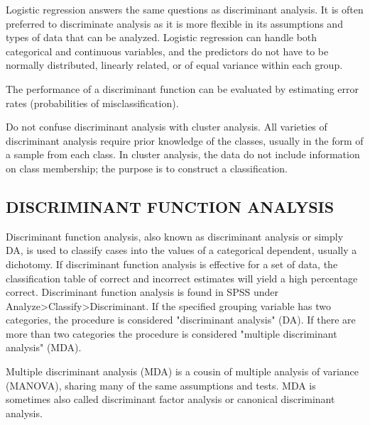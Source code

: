 
%
%
%

Logistic regression answers the same questions as discriminant analysis. It is
often preferred to discriminate analysis as it is more flexible in its assumptions
and types of data that can be analyzed. Logistic regression can handle both
categorical and continuous variables, and the predictors do not have to be
normally distributed, linearly related, or of equal variance within each group.

The performance of a discriminant function can be evaluated by estimating error rates
(probabilities of misclassification).

Do not confuse discriminant analysis with cluster analysis. All varieties of discriminant
analysis require prior knowledge of the classes, usually in the form of a sample
from each class. In cluster analysis, the data do not include information on class
membership; the purpose is to construct a classification.

\subsection{DISCRIMINANT FUNCTION ANALYSIS}

Discriminant function analysis, also known as discriminant analysis or simply DA, is used to classify cases into the values of a categorical dependent, usually a dichotomy. If discriminant function analysis is effective for a set of data, the classification table of correct and incorrect estimates will yield a high percentage correct. Discriminant function analysis is found in SPSS under Analyze>Classify>Discriminant. If the specified grouping variable has two categories, the procedure is considered "discriminant analysis" (DA). If there are more than two categories the procedure is considered "multiple discriminant analysis" (MDA).

Multiple discriminant analysis (MDA) is a cousin of multiple analysis of variance (MANOVA), sharing many of the same assumptions and tests. MDA is sometimes also called discriminant factor analysis or canonical discriminant analysis.

